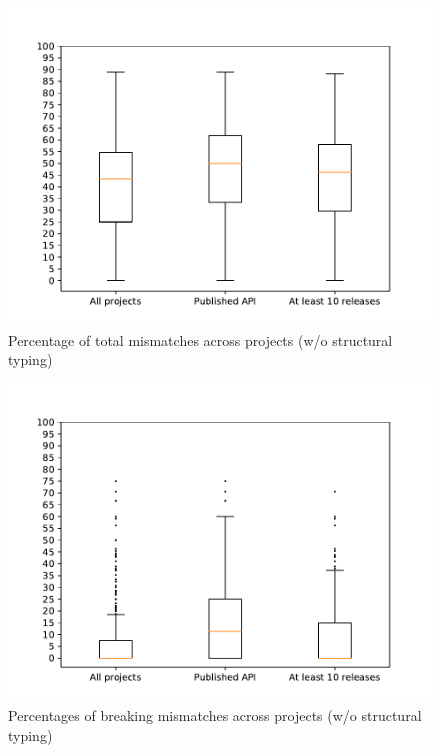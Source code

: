 \documentclass{l4proj}
\begin{document}
\begin{appendices}
\begin{figure}[]
\centering
\caption{Percentage of total mismatches across projects (w/o structural
typing)}
\label{BoxplotsMismatches}
\includegraphics[height=0.4\textheight]
{images/evaluation/boxplots_mismatches}
\end{figure}

\begin{figure}[]
\centering
\caption{Percentages of breaking mismatches across projects (w/o
structural typing)}
\label{BoxplotsBreaking}
\includegraphics[height=0.4\textheight]
{images/evaluation/boxplots_breaking}
\end{figure}


\end{appendices}
\end{document}
